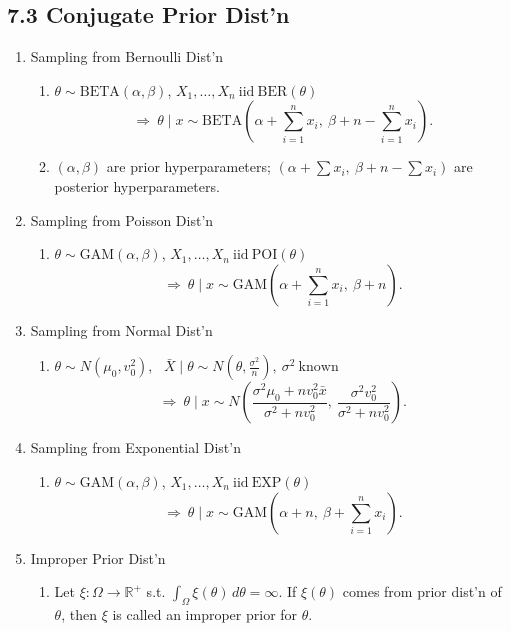 \documentclass[11pt]{article}
\begin{document}
\subsection*{7.3 Conjugate Prior Dist'n}
\begin{enumerate}[label=\Roman*.]
  \item Sampling from Bernoulli Dist'n
  \begin{enumerate}[label=\Alph*.]
    \item $\theta\sim\text{BETA}(\alpha,\beta)$, $X_{1},\dots,X_{n}\ \text{iid}\ \text{BER}(\theta)$
    \[
      \Rightarrow\ \theta\mid x \sim \text{BETA}\!\left(\alpha+\sum_{i=1}^{n}x_{i},\ \beta+n-\sum_{i=1}^{n}x_{i}\right).
    \]
    \item $(\alpha,\beta)$ are prior hyperparameters; $\left(\alpha+\sum x_{i},\ \beta+n-\sum x_{i}\right)$ are posterior hyperparameters.
  \end{enumerate}
  \item Sampling from Poisson Dist'n
  \begin{enumerate}[label=\Alph*.]
    \item $\theta\sim\text{GAM}(\alpha,\beta)$, $X_{1},\dots,X_{n}\ \text{iid}\ \text{POI}(\theta)$
    \[
      \Rightarrow\ \theta\mid x \sim \text{GAM}\!\left(\alpha+\sum_{i=1}^{n}x_{i},\ \beta+n\right).
    \]
  \end{enumerate}
  \item Sampling from Normal Dist'n
  \begin{enumerate}[label=\Alph*.]
    \item $\theta\sim N(\mu_{0},v_{0}^{2})$, \ $\bar X\mid\theta \sim N\!\left(\theta,\frac{\sigma^{2}}{n}\right),\ \sigma^{2}\ \text{known}$
    \[
      \Rightarrow\ \theta\mid x \sim N\!\left(\frac{\sigma^{2}\mu_{0}+n v_{0}^{2}\bar x}{\sigma^{2}+n v_{0}^{2}},\ \frac{\sigma^{2}v_{0}^{2}}{\sigma^{2}+n v_{0}^{2}}\right).
    \]
  \end{enumerate}
  \item Sampling from Exponential Dist'n
  \begin{enumerate}[label=\Alph*.]
    \item $\theta\sim\text{GAM}(\alpha,\beta)$, $X_{1},\dots,X_{n}\ \text{iid}\ \text{EXP}(\theta)$
    \[
      \Rightarrow\ \theta\mid x \sim \text{GAM}\!\left(\alpha+n,\ \beta+\sum_{i=1}^{n}x_{i}\right).
    \]
  \end{enumerate}
  \item Improper Prior Dist'n
  \begin{enumerate}[label=\Alph*.]
    \item Let $\xi:\Omega\to\mathbb{R}^{+}$ s.t. $\int_{\Omega}\xi(\theta)\,d\theta=\infty$.
    If $\xi(\theta)$ comes from prior dist'n of $\theta$, then $\xi$ is called an improper prior for $\theta$.
  \end{enumerate}
\end{enumerate}
\end{document}
